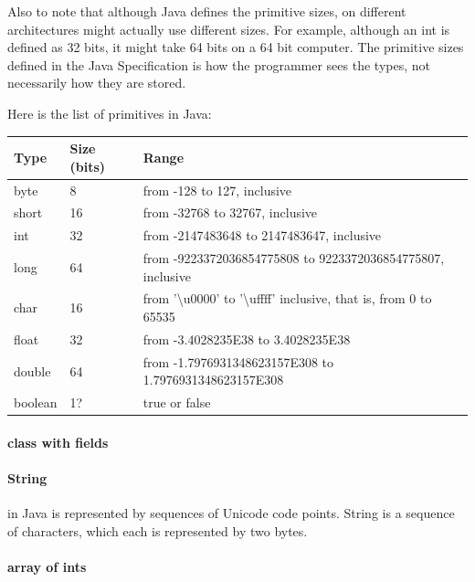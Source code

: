 \documentclass[fleqn,10pt]{SelfArx} %
\begin{document}
Also to note that although Java defines the primitive sizes, on different architectures might actually use different sizes. For example, although an int is defined as 32 bits, it might take 64 bits on a 64 bit computer. The primitive sizes defined in the Java Specification is how the programmer sees the types, not necessarily how they are stored.

Here is the list of primitives in Java\cite{gosling}:

\begin{center}
\begin{tabulary}{\columnwidth}{ | p{0.1\columnwidth} | p{0.15\columnwidth} | p{0.55\columnwidth} |}
\hline
\textbf{Type} & \textbf{Size (bits)} & \textbf{Range} \\ \hline 
byte  & 8  & from -128 to 127, inclusive \\ \hline 
short & 16 & from -32768 to 32767, inclusive \\ \hline 
int   & 32 & from -2147483648 to 2147483647, inclusive \\ \hline 
long  & 64 & from -9223372036854775808 to 9223372036854775807, inclusive \\ \hline
char  & 16 & from '\textbackslash{}u0000' to '\textbackslash{}uffff' inclusive, that is, from 0 to 65535 \\ \hline 
float & 32 & from -3.4028235E38 to 3.4028235E38\footnotemark[3] \\ \hline
double & 64 &from -1.7976931348623157E308 to 1.7976931348623157E308\footnotemark[3] \\ \hline
boolean & 1?\footnotemark[4] & true or false \\ \hline
\end{tabulary}
\end{center}

\paragraph{class with fields}
\paragraph{String} in Java is represented by sequences of Unicode code points. String is a sequence of characters, which each is represented by two bytes. 
\paragraph{array of ints}
\end{document}
